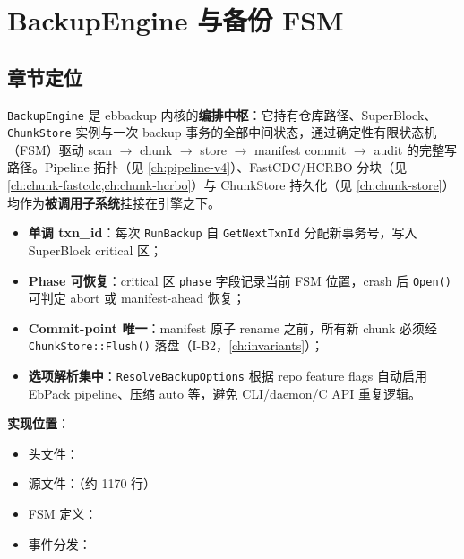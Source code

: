 \chapter{BackupEngine 与备份 FSM}
\label{ch:backup-engine}

\section{章节定位}

\texttt{BackupEngine} 是 ebbackup 内核的\textbf{编排中枢}：它持有仓库路径、SuperBlock、\texttt{ChunkStore} 实例与一次 backup 事务的全部中间状态，通过确定性有限状态机（FSM）驱动 scan $\rightarrow$ chunk $\rightarrow$ store $\rightarrow$ manifest commit $\rightarrow$ audit 的完整写路径。Pipeline 拓扑（见 \cref{ch:pipeline-v4}）、FastCDC/HCRBO 分块（见 \cref{ch:chunk-fastcdc,ch:chunk-hcrbo}）与 ChunkStore 持久化（见 \cref{ch:chunk-store}）均作为\textbf{被调用子系统}挂接在引擎之下。

\begin{designbox}[设计原则]
\begin{itemize}[nosep]
  \item \textbf{单调 txn\_id}：每次 \texttt{RunBackup} 自 \texttt{GetNextTxnId} 分配新事务号，写入 SuperBlock critical 区；
  \item \textbf{Phase 可恢复}：critical 区 \texttt{phase} 字段记录当前 FSM 位置，crash 后 \texttt{Open()} 可判定 abort 或 manifest-ahead 恢复；
  \item \textbf{Commit-point 唯一}：manifest 原子 rename 之前，所有新 chunk 必须经 \texttt{ChunkStore::Flush()} 落盘（I-B2，\cref{ch:invariants}）；
  \item \textbf{选项解析集中}：\texttt{ResolveBackupOptions} 根据 repo feature flags 自动启用 EbPack pipeline、压缩 auto 等，避免 CLI/daemon/C API 重复逻辑。
\end{itemize}
\end{designbox}

\textbf{实现位置}：
\begin{itemize}[nosep]
  \item 头文件：
  \item 源文件：（约 1170 行）
  \item FSM 定义：
  \item 事件分发：
\end{itemize}

